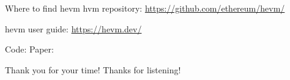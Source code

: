 \documentclass[aspectratio=169]{beamer}
\begin{document}
\begin{frame}[fragile=singleslide]{Where to find hevm}
hvm repository: \url{https://github.com/ethereum/hevm/}

hevm user guide: \url{https://hevm.dev/}
\bigskip

Code: \qquad {}
\qquad \qquad \qquad Paper: \qquad {}




\end{frame}

\begin{frame}{Thank you for your time!}
    Thanks for listening!
\end{frame}


%
\end{document}
